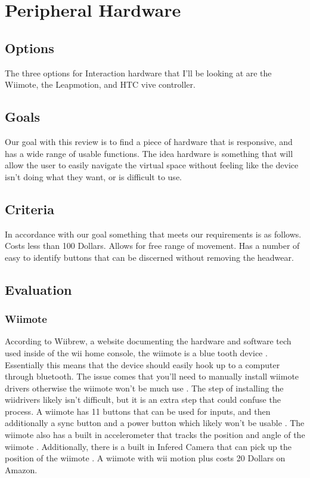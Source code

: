 \documentclass{article}
\begin{document}
\section{Peripheral Hardware}
\subsection{Options}
The three options for Interaction hardware that I'll be looking at are the Wiimote, the Leapmotion, and HTC vive controller.

\subsection{Goals}
Our goal with this review is to find a piece of hardware that is responsive, and has a wide range of usable functions. The idea hardware is something that will allow the user to easily navigate the virtual space without feeling like the device isn't doing what they want, or is difficult to use.

\subsection{Criteria}
In accordance with our goal something that meets our requirements is as follows.
Costs less than 100 Dollars.
Allows for free range of movement.
Has a number of easy to identify buttons that can be discerned without removing the headwear.

\subsection{Evaluation}
\subsubsection{Wiimote}
According to Wiibrew, a website documenting the hardware and software tech used inside of the wii home console, the wiimote is a blue tooth device \cite{wiibrew}.
Essentially this means that the device should easily hook up to a computer through bluetooth.
The issue comes that you'll need to manually install wiimote drivers otherwise the wiimote won't be much use \cite{wiibrew}.
The step of installing the wiidrivers likely isn't difficult, but it is an extra step that could confuse the process.
A wiimote has 11 buttons that can be used for inputs, and then additionally a sync button and a power button which likely won't be usable \cite{wiibrew}.
The wiimote also has a built in accelerometer that tracks the position and angle of the wiimote \cite{wiibrew}.
Additionally, there is a built in Infered Camera that can pick up the position of the wiimote \cite{wiibrew}.
A wiimote with wii motion plus costs 20 Dollars on Amazon.
\end{document}

